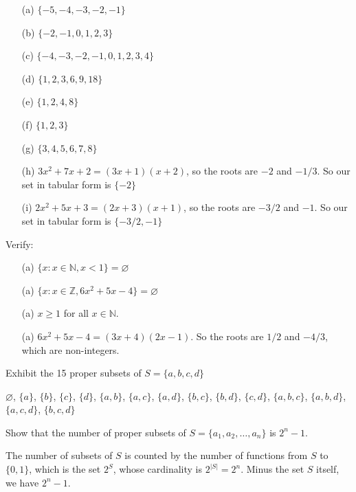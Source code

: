 \answer
\begin{enumerate}
    \item[(a)]
        $\{-5, -4, -3, -2, -1\}$
    \item[(b)]
        $\{-2, -1, 0, 1, 2, 3\}$
    \item[(c)]
        $\{-4, -3, -2, -1, 0, 1, 2, 3, 4\}$
    \item[(d)]
        $\{1, 2, 3, 6, 9, 18\}$
    \item[(e)]
        $\{1, 2, 4, 8\}$
    \item[(f)]
        $\{1, 2, 3\}$
    \item[(g)]
        $\{3, 4, 5, 6, 7, 8\}$
    \item[(h)]
        $3x^2 + 7x + 2 = (3x+1)(x+2)$, so the roots are $-2$ and $-1/3$. So our set in tabular form is $\{-2\}$
    \item[(i)]
        $2x^2 + 5x + 3 = (2x + 3)(x + 1)$, so the roots are $-3/2$ and $-1$. So our set in tabular form is $\{-3/2, -1\}$
\end{enumerate}


\exercise
Verify: 
\begin{itemize}
    \item[(a)]
        $\{x : x \in \mathbb{N}, x < 1\} = \varnothing$
    \item[(a)]
        $\{x : x \in \mathbb{Z}, 6x^2 + 5x - 4\} = \varnothing$
\end{itemize}

\answer
\begin{itemize}
    \item[(a)]
        $x \geq 1$ for all $x \in \mathbb{N}$. 
    \item[(a)]
        $6x^2 + 5x - 4 = (3x + 4)(2x - 1)$. So the roots are $1/2$ and $-4/3$, which are non-integers.
\end{itemize}


\exercise
Exhibit the 15 proper subsets of $S = \{a,b,c,d\}$

\answer
$\varnothing$, $\{a\}$,  $\{b\}$,  $\{c\}$,  $\{d\}$,  $\{a, b\}$,  $\{a, c\}$,  $\{a, d\}$,  $\{b, c\}$,  $\{b, d\}$,  $\{c, d\}$, $\{a, b, c\}$, $\{a, b, d\}$, $\{a, c, d\}$, $\{b, c, d\}$ 


\exercise
Show that the number of proper subsets of $S = \{a_1, a_2, \ldots, a_n\}$ is $2^n-1$. 

\answer
The number of subsets of $S$ is counted by the number of functions from $S$ to $\{0, 1\}$, which is the set $2^S$, whose cardinality is $2^{|S|} = 2^n$. Minus the set $S$ itself, we have $2^n - 1$.


